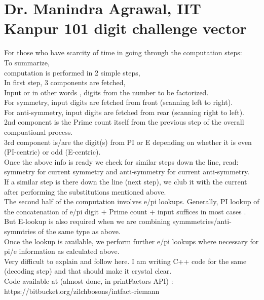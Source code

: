 \section{Dr. Manindra Agrawal, IIT Kanpur 101 digit challenge vector}

For those who have scarcity of time in going through the computation steps: \\
To summarize, \\
computation is performed in 2 simple steps, \\
In first step, 3 components are fetched, \\
Input or in other words , digits from the number to be factorized. \\
For symmetry, input digits are fetched from front (scanning left to right). \\
For anti-symmetry, input digits are fetched from rear (scanning right to left). \\

2nd component is the Prime count itself from the previous step of the overall compuational process. \\

3rd component is/are the digit(s) from PI or E depending on whether it is even (PI-centric) or odd (E-centric). \\

Once the above info is ready we check for similar steps down the line, read: symmetry for current symmetry and anti-symmetry for current anti-symmetry. \\

If a similar step is there down the line (next step), we club it with the current after performing the substitutions mentioned above. \\

The second half of the computation involves e/pi lookups. Generally, PI lookup of the concatenation of e/pi digit + Prime count + input suffices in most cases . \\
But E-lookup is also required when we are combining symmmetries/anti-symmtries of the same type as above. \\
Once the lookup is available, we perform further e/pi lookups where necessary for pi/e information as calculated above. \\
Very difficult to explain and follow here. I am writing C++ code for the same (decoding step) and that should make it crystal clear. \\
Code available at (almost done, in printFactors API) : https://bitbucket.org/zilchbosons/intfact-riemann \\

